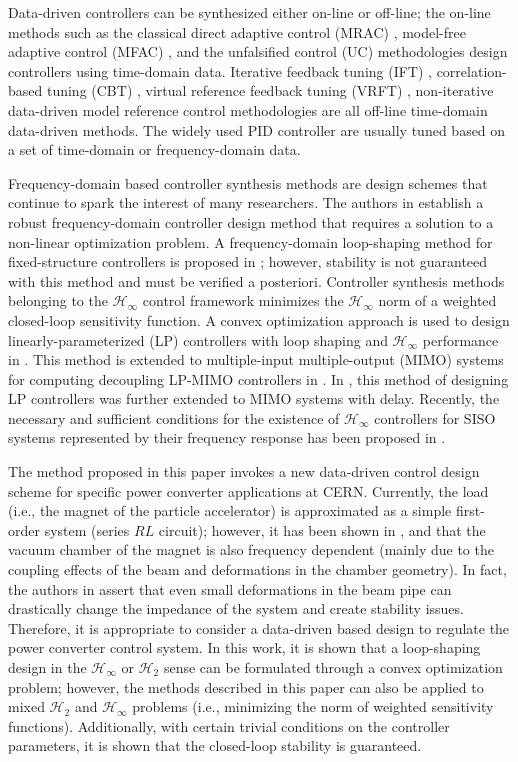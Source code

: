 \documentclass[a4paper, 10pt, conference]{ieeeconf}
\begin{document}
Data-driven controllers can be synthesized either on-line or off-line; the on-line methods such as the classical direct adaptive control (MRAC) \cite{LLMK11}, model-free adaptive control (MFAC) \cite{HJ13}, and the unfalsified control (UC) \cite{ST97} methodologies design controllers using time-domain data. Iterative feedback tuning (IFT) \cite{Hja02}, correlation-based tuning (CBT) \cite{KMB02a}, virtual reference feedback tuning (VRFT) \cite{CLS02}, non-iterative data-driven model reference control \cite{KVB07} methodologies are all off-line time-domain data-driven methods.  The widely used PID controller are usually tuned based on a set of time-domain or frequency-domain data. 

Frequency-domain based controller synthesis methods are design schemes that continue to spark the interest of many researchers. The authors in \cite{KNND13b} establish a robust frequency-domain controller design method that requires a solution to a non-linear optimization problem. A frequency-domain loop-shaping method for fixed-structure controllers is proposed in \cite{KNND13c}; however, stability is not guaranteed with this method and must be verified a posteriori. Controller synthesis methods belonging to the $\mathcal{H}_{\infty}$ control framework minimizes the $\mathcal{H}_{\infty}$ norm of a weighted closed-loop sensitivity function. A convex optimization approach is used to design linearly-parameterized (LP) controllers with loop shaping and $\mathcal{H}_{\infty}$ performance in \cite{KG10}. This method is extended to multiple-input multiple-output (MIMO) systems for computing decoupling LP-MIMO controllers in \cite{GKL10b}. In \cite{NK14}, this method of designing LP controllers was further extended to MIMO systems with delay. Recently, the necessary and sufficient conditions for the existence of $\mathcal{H}_{\infty}$ controllers for SISO systems represented by their frequency response has been proposed in \cite{KNZ16}.

The method proposed in this paper invokes a new data-driven control design scheme for specific power converter applications at CERN. Currently, the load (i.e., the magnet of the particle accelerator) is approximated as a simple first-order system (series $RL$ circuit); however, it has been shown in \cite{KZ98}, \cite{NW95} and \cite{NS79} that the vacuum chamber of the magnet is also frequency dependent (mainly due to the coupling effects of the beam and deformations in the chamber geometry). In fact, the authors in \cite{NW95} assert that even small deformations in the beam pipe can drastically change the impedance of the system and create stability issues. Therefore, it is appropriate to consider a data-driven based design to regulate the power converter control system.  In this work, it is shown that a loop-shaping design in the $\mathcal{H}_\infty$ or $\mathcal{H}_2$ sense can be formulated through a convex optimization problem; however, the methods described in this paper can also be applied to mixed $\mathcal{H}_2$ and $\mathcal{H}_\infty$ problems (i.e., minimizing the norm of weighted sensitivity functions). Additionally, with certain trivial conditions on the controller parameters, it is shown that the closed-loop stability is guaranteed. 
\end{document}
